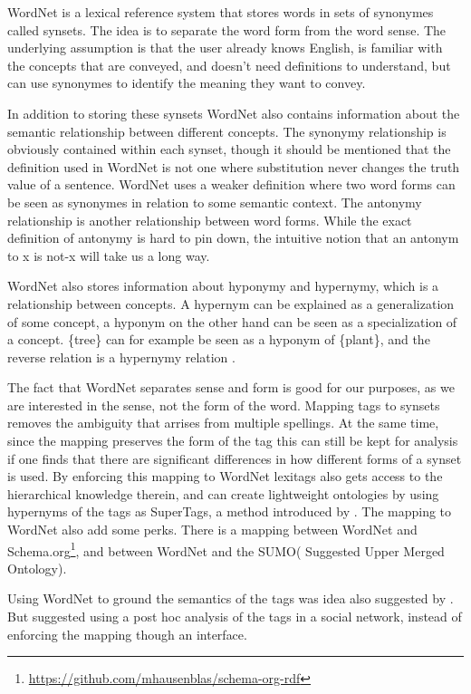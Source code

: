 WordNet is a lexical reference system that stores words in sets of synonymes called synsets. The idea is to separate the word form from the word sense. 
The underlying assumption is that the user already knows English, is familiar with the concepts that are conveyed, 
and doesn't need definitions to understand, but can use synonymes to identify the meaning they want to convey\citep{Miller1990}.

In addition to storing these synsets WordNet also contains information about the semantic relationship between different concepts. 
The synonymy relationship is obviously contained within each synset, 
though it should be mentioned that the definition used in WordNet is not one where substitution never changes the truth value of a sentence. 
WordNet uses a weaker definition where two word forms can be seen as synonymes in relation to some semantic context. 
The antonymy relationship is another relationship between word forms. While the exact definition of antonymy is hard to pin down, the intuitive notion that an antonym to x is not-x will take us a long way\citep{Miller1990}.

WordNet also stores information about hyponymy and hypernymy, which is a relationship between concepts.
 A hypernym can be explained as a generalization of some concept, a hyponym on the other hand can be seen as a specialization of a concept. 
 \{tree\} can for example be seen as a hyponym of \{plant\}, and the reverse relation is a hypernymy relation \citep{Veres2010}.

The fact that WordNet separates sense and form is good for our purposes, as we are interested in the sense, not the form of the word. 
Mapping tags to synsets removes the ambiguity that arrises from multiple spellings. 
At the same time, since the mapping preserves the form of the tag this can still be kept for analysis if one finds that there are significant differences in how different forms of a synset is used\citep{Veres2011}.
By enforcing this mapping to WordNet lexitags also gets access to the hierarchical knowledge therein, and can create lightweight ontologies by using hypernyms of the tags as SuperTags, a method introduced by \citet{Veres2010}.
The mapping to WordNet also add some perks. There is a mapping between WordNet and Schema.org\footnote{\url{https://github.com/mhausenblas/schema-org-rdf}}, and between WordNet and the SUMO( Suggested Upper Merged Ontology)\citep{Niles2003}.

Using WordNet to ground the semantics of the tags was idea also suggested by \citet{Cattuto2008}. But \citet{Cattuto2008} suggested using a post hoc analysis of the tags in a social network, instead of enforcing the mapping though an interface.

